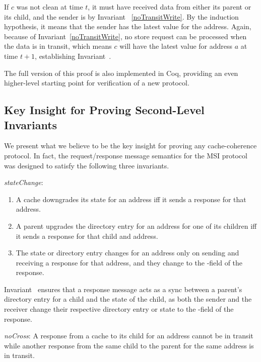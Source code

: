 If $c$ was not clean at time $t$, it must have received data from either its
parent or its child, and the sender is \clean{} by Invariant~
\ref{noTransitWrite}. By the induction hypothesis, it means that the sender has
the latest value for the address. Again, because of
Invariant~\ref{noTransitWrite}, no store request can be processed when the data
is in transit, which means $c$ will have the latest value for address $a$ at
time $t+1$, establishing Invariant~.

The full version of this proof is also implemented in Coq, providing an even
higher-level starting point for verification of a new protocol.

\subsection{Key Insight for Proving Second-Level Invariants}

We present what we believe to be the key insight for proving any cache-coherence protocol.
In fact, the request/response message semantics for the MSI protocol was designed to satisfy
the following three invariants.

\begin{inv}
\textit{stateChange}:
\begin{enumerate}
\item A cache downgrades its state for an address iff it sends a response for that address.
\item A parent upgrades the directory entry for an address for one of its
children iff it sends a response for that child and address.
\item The state or directory entry changes for an address only on sending and
receiving a response for that address, and they change to the \myto-field of the response.
\end{enumerate}
\label{stateChange}
\end{inv}

\vspace{-.1in}

Invariant~ ensures that a response message acts as a sync
between a parent's directory entry for a child and the state of the child, as
both the sender and the receiver change their respective directory entry or
state to the \myto-field of the response.

\begin{inv}
\textit{noCross}: A response from a cache to its child for an address cannot
be in transit while another response from the same child to the parent for the
same address is in transit.
\label{noCross}
\end{inv}

